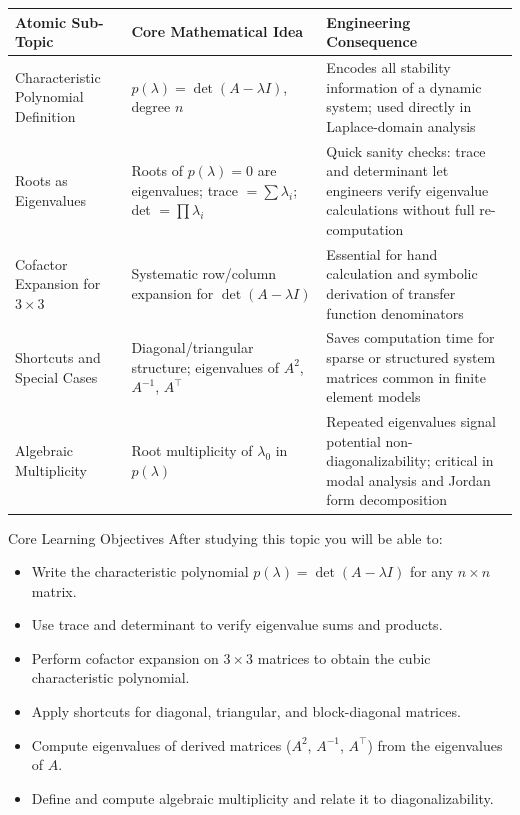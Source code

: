 \documentclass[12pt,a4paper]{article}
\begin{document}
\begin{center}
\begin{tabular}{@{}p{4cm} p{5cm} p{5.5cm}@{}}
\toprule
\textbf{Atomic Sub-Topic} & \textbf{Core Mathematical Idea} & \textbf{Engineering Consequence} \\
\midrule
Characteristic Polynomial Definition
  & $p(\lambda)=\det(A-\lambda I)$, degree $n$
  & Encodes all stability information of a dynamic system; used directly in Laplace-domain analysis \\
\addlinespace
Roots as Eigenvalues
  & Roots of $p(\lambda)=0$ are eigenvalues; trace $=\sum\lambda_i$; det $=\prod\lambda_i$
  & Quick sanity checks: trace and determinant let engineers verify eigenvalue calculations without full re-computation \\
\addlinespace
Cofactor Expansion for $3\times3$
  & Systematic row/column expansion for $\det(A-\lambda I)$
  & Essential for hand calculation and symbolic derivation of transfer function denominators \\
\addlinespace
Shortcuts and Special Cases
  & Diagonal/triangular structure; eigenvalues of $A^2$, $A^{-1}$, $A^\top$
  & Saves computation time for sparse or structured system matrices common in finite element models \\
\addlinespace
Algebraic Multiplicity
  & Root multiplicity of $\lambda_0$ in $p(\lambda)$
  & Repeated eigenvalues signal potential non-diagonalizability; critical in modal analysis and Jordan form decomposition \\
\bottomrule
\end{tabular}
\end{center}

\vspace{1em}
\begin{learnbox}{Core Learning Objectives}
After studying this topic you will be able to:
\begin{itemize}[leftmargin=*]
  \item Write the characteristic polynomial $p(\lambda)=\det(A-\lambda I)$ for any $n\times n$ matrix.
  \item Use trace and determinant to verify eigenvalue sums and products.
  \item Perform cofactor expansion on $3\times 3$ matrices to obtain the cubic characteristic polynomial.
  \item Apply shortcuts for diagonal, triangular, and block-diagonal matrices.
  \item Compute eigenvalues of derived matrices ($A^2$, $A^{-1}$, $A^\top$) from the eigenvalues of $A$.
  \item Define and compute algebraic multiplicity and relate it to diagonalizability.
\end{itemize}
\end{learnbox}
\end{document}
